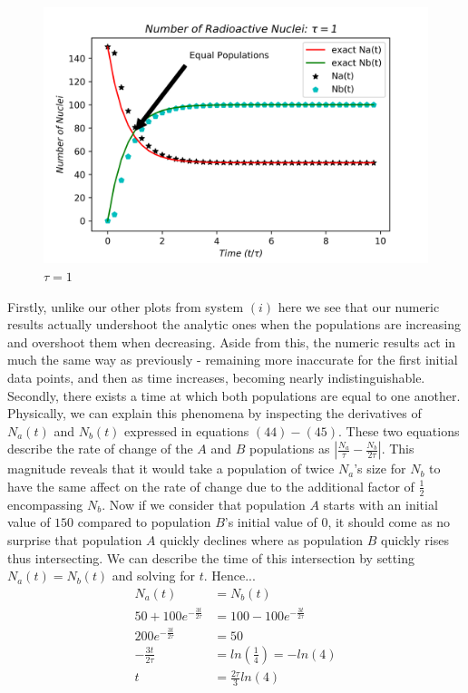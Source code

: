 \documentclass[twocolumn]{article}
\begin{document}
\begin{figure}[h]
\caption{$\tau = 1$}
\centering
\includegraphics[scale=.6]{Radioactive_DecayPart2}
\end{figure}
Firstly, unlike our other plots from system $(i)$ here we see that our numeric results actually undershoot the analytic ones when the populations are increasing and overshoot them when decreasing. Aside from this, the numeric results act in much the same way as previously - remaining more inaccurate for the first initial data points, and then as time increases, becoming nearly indistinguishable. Secondly, there exists a time at which both populations are equal to one another. Physically, we can explain this phenomena by inspecting the derivatives of $N_a(t)$ and $N_b(t)$ expressed in equations $(44)-(45)$. These two equations describe the rate of change of the $A$ and $B$ populations as $\left|\frac{N_a}{\tau}-\frac{N_b}{2\tau}\right|$. This magnitude reveals that it would take a population of twice $N_a$'s size for $N_b$ to have the same affect on the rate of change due to the additional factor of $\frac{1}{2}$ encompassing $N_b$. Now if we consider that population $A$ starts with an initial value of $150$ compared to population $B$'s initial value of $0$, it should come as no surprise that population $A$ quickly declines where as population $B$ quickly rises thus intersecting. We can describe the time of this intersection by setting $N_a(t)=N_b(t)$ and solving for $t$. Hence...
	\begin{align}
	N_a(t)&=N_b(t)\\
	50+100e^{-\frac{3t}{2\tau}}&=100-100e^{-\frac{3t}{2\tau}}\\
	200e^{-\frac{3t}{2\tau}}&=50\\
	-\frac{3t}{2\tau}&=ln\left(\frac{1}{4}\right)=-ln\left(4\right)\\
	t&=\frac{2\tau}{3}ln\left(4\right)
	\end{align}
\end{document}
